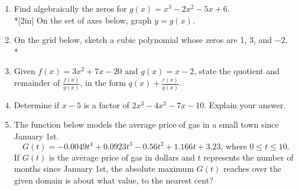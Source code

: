 \documentclass[12pt, oneside]{article}
\begin{document}
\begin{enumerate}
\newpage
\item Find algebraically the zeros for  $g(x)=x^3-2x^2-5x+6$.\\*[2in]
On the set of axes below, graph $y=g(x)$.
\begin{center}
\end{center} %

\newpage

\item On the grid below, sketch a cubic polynomial whose zeros are 1, 3, and $-2$.\\*
\begin{center}
\end{center} %

\newpage

\item Given $f(x)=3x^2+7x-20$ and $g(x)=x-2$, state the quotient and remainder of $\displaystyle \frac{f(x)}{g(x)}$, in the form $\displaystyle q(x)+ \frac{r(x)}{g(x)}$. \\[4in] %

\item Determine if $x-5$ is a factor of $2x^3-4x^2-7x-10$. Explain your answer. %
\newpage

\item The function below models the average price of gas in a small town since January 1st.
\[G(t)=-0.0049t^4 + 0.0923t^3 - 0.56t^2 +1.166t+3.23 \text{, where } 0 \leq t \leq 10.\]
If $G(t)$ is the average price of gas in dollars and $t$ represents the number of months since January 1st, the absolute maximum $G(t)$ reaches over the given domain is about what value, to the nearest cent? \\[3in] %


\end{enumerate}
\end{document}

